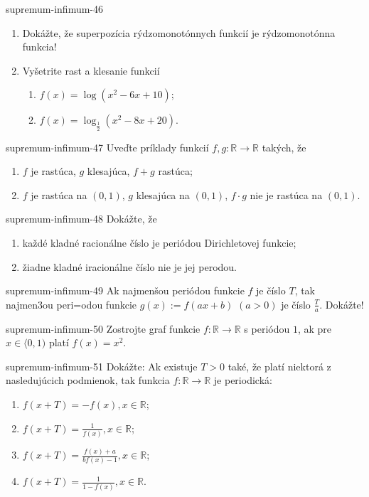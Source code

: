 \begin{defproblem}{supremum-infimum-46}
\begin{enumerate}
\item Dokážte, že superpozícia rýdzomonotónnych funkcií je rýdzomonotónna funkcia!
\item Vyšetrite rast a klesanie funkcií
\begin{enumerate}
\item $f(x)=\log (x^2-6x+10)$;
\item $f(x)=\log_\frac{1}{2}(x^2-8x+20)$.
\end{enumerate}
\end{enumerate}
\end{defproblem}

\begin{defproblem}{supremum-infimum-47}
Uveďte príklady funkcií $f,g:\mathbb{R}\rightarrow\mathbb{R}$ takých, že
\begin{enumerate}
\item $f$ je rastúca, $g$ klesajúca, $f+g$ rastúca;
\item $f$ je rastúca na $(0,1)$, $g$ klesajúca na $(0,1)$, $f\cdot g$ nie je rastúca na $(0,1)$.
\end{enumerate}
\end{defproblem}

\begin{defproblem}{supremum-infimum-48}
Dokážte, že
\begin{enumerate}
\item každé kladné racionálne číslo je periódou Dirichletovej funkcie;
\item žiadne kladné iracionálne číslo nie je jej perodou.
\end{enumerate}
\end{defproblem}

\begin{defproblem}{supremum-infimum-49}
Ak najmenšou periódou funkcie $f$ je číslo $T$, tak najmen3ou peri=odou funkcie $g(x):=f(ax+b)$ $(a>0)$ je číslo $\frac{T}{a}$. Dokážte!
\end{defproblem}

\begin{defproblem}{supremum-infimum-50}
Zostrojte graf funkcie $f:\mathbb{R}\rightarrow\mathbb{R}$ s periódou $1$, ak pre $x\in\langle 0,1)$ platí $f(x)=x^2$.
\end{defproblem}

\begin{defproblem}{supremum-infimum-51}
Dokážte: Ak existuje $T>0$ také, že platí niektorá z nasledujúcich podmienok, tak funkcia $f:\mathbb{R}\rightarrow\mathbb{R}$ je periodická:
\begin{multicols}{2}
\begin{enumerate}
    \item $f(x+T)=-f(x),x\in\mathbb{R}$;
    \item $f(x+T)=\frac{1}{f(x)},x\in\mathbb{R}$;
    \item $f(x+T)=\frac{f(x)+a}{bf(x)-1},x\in\mathbb{R}$;
    \item $f(x+T)=\frac{1}{1-f(x)},x\in\mathbb{R}$.
\end{enumerate}
\end{multicols}
\end{defproblem}

